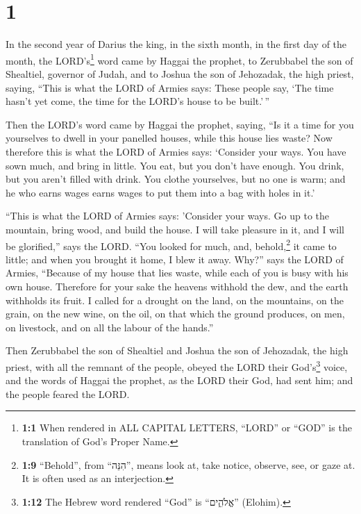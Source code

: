 \hypertarget{section}{%
\section{1}\label{section}}

 In the second year of Darius the king, in the sixth
month, in the first day of the month, the LORD's\footnote{\textbf{1:1}
  When rendered in ALL CAPITAL LETTERS, ``LORD'' or ``GOD'' is the
  translation of God's Proper Name.} word came by Haggai the prophet, to
Zerubbabel the son of Shealtiel, governor of Judah, and to Joshua the
son of Jehozadak, the high priest, saying,  ``This is what
the LORD of Armies says: These people say, `The time hasn't yet come,
the time for the LORD's house to be built.'\,''

 Then the LORD's word came by Haggai the prophet, saying,
 ``Is it a time for you yourselves to dwell in your
panelled houses, while this house lies waste?  Now
therefore this is what the LORD of Armies says: `Consider your ways.
 You have sown much, and bring in little. You eat, but you
don't have enough. You drink, but you aren't filled with drink. You
clothe yourselves, but no one is warm; and he who earns wages earns
wages to put them into a bag with holes in it.'

 ``This is what the LORD of Armies says: 'Consider your
ways.  Go up to the mountain, bring wood, and build the
house. I will take pleasure in it, and I will be glorified,'' says the
LORD.  ``You looked for much, and, behold,\footnote{\textbf{1:9}
  ``Behold'', from ``הִנֵּה'', means look at, take notice, observe, see,
  or gaze at. It is often used as an interjection.} it came to little;
and when you brought it home, I blew it away. Why?'' says the LORD of
Armies, ``Because of my house that lies waste, while each of you is busy
with his own house.  Therefore for your sake the heavens
withhold the dew, and the earth withholds its fruit.  I
called for a drought on the land, on the mountains, on the grain, on the
new wine, on the oil, on that which the ground produces, on men, on
livestock, and on all the labour of the hands.''

 Then Zerubbabel the son of Shealtiel and Joshua the son
of Jehozadak, the high priest, with all the remnant of the people,
obeyed the LORD their God's\footnote{\textbf{1:12} The Hebrew word
  rendered ``God'' is ``אֱלֹהִ֑ים'' (Elohim).} voice, and the words of
Haggai the prophet, as the LORD their God, had sent him; and the people
feared the LORD.

